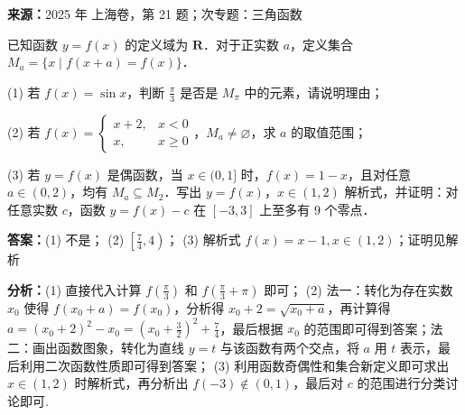 \begin{question}[points=18]
\textbf{来源：}2025 年 上海卷，第 21 题；次专题：三角函数\par
已知函数 $y = f(x)$ 的定义域为 $\mathbf{R}$．对于正实数 $a$，定义集合 $M_a = \{x \mid f(x+a) = f(x)\}$．

(1) 若 $f(x) = \sin x$，判断 $\frac{\pi}{3}$ 是否是 $M_\pi$ 中的元素，请说明理由；

(2) 若 $f(x) = \begin{cases} x+2, & x < 0 \\ x, & x \geq 0 \end{cases}$，$M_a \neq \varnothing$，求 $a$ 的取值范围；

(3) 若 $y = f(x)$ 是偶函数，当 $x \in (0,1]$ 时，$f(x) = 1 - x$，且对任意 $a \in (0,2)$，均有 $M_a \subseteq M_2$．写出 $y = f(x)$，$x \in (1,2)$ 解析式，并证明：对任意实数 $c$，函数 $y = f(x) - c$ 在 $[-3,3]$ 上至多有 $9$ 个零点．
\begin{solution}
\textbf{答案：}(1) 不是； (2) $\left[\frac{7}{4}, 4\right)$； (3) 解析式 $f(x) = x - 1, x \in (1,2)$；证明见解析

\textbf{分析：}(1) 直接代入计算 $f\left(\frac{\pi}{3}\right)$ 和 $f\left(\frac{\pi}{3} + \pi\right)$ 即可； (2) 法一：转化为存在实数 $x_0$ 使得 $f(x_0 + a) = f(x_0)$，分析得 $x_0 + 2 = \sqrt{x_0 + a}$，再计算得 $a = (x_0 + 2)^2 - x_0 = \left(x_0 + \frac{3}{2}\right)^2 + \frac{7}{4}$，最后根据 $x_0$ 的范围即可得到答案；法二：画出函数图象，转化为直线 $y = t$ 与该函数有两个交点，将 $a$ 用 $t$ 表示，最后利用二次函数性质即可得到答案； (3) 利用函数奇偶性和集合新定义即可求出 $x \in (1,2)$ 时解析式，再分析出 $f(-3) \notin (0,1)$，最后对 $c$ 的范围进行分类讨论即可.


\end{solution}
\end{question}
